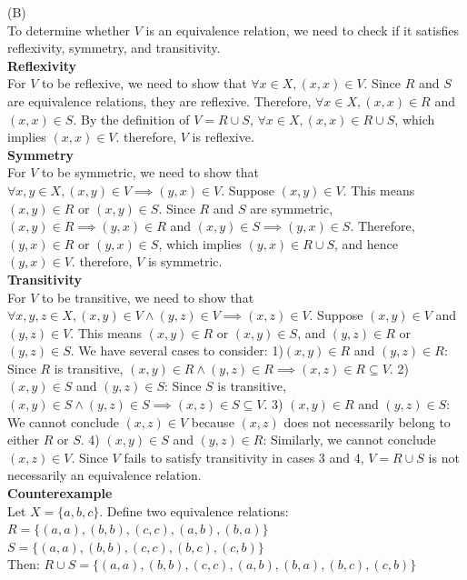 \documentclass[solution,letterpaper]{cs20}
\begin{document}
\begin{problem}
\begin{solution}
        (B) \\
        To determine whether \( V \) is an equivalence relation, we need to check if it satisfies reflexivity, symmetry, and transitivity. \\
        \textbf{Reflexivity} \\
        For \( V \) to be reflexive, we need to show that \(\forall x \in X, (x, x) \in V\). Since \( R \) and \( S \) are equivalence relations, they are reflexive. Therefore, \(\forall x \in X, (x, x) \in R\) and \((x, x) \in S\). By the definition of \( V = R \cup S \), \(\forall x \in X, (x, x) \in R \cup S\), which implies \((x, x) \in V\). therefore, \( V \) is reflexive. \\
        \textbf{Symmetry} \\
        For \( V \) to be symmetric, we need to show that \(\forall x, y \in X, (x, y) \in V \implies (y, x) \in V\). Suppose \((x, y) \in V\). This means \((x, y) \in R\) or \((x, y) \in S\). Since \( R \) and \( S \) are symmetric, \((x, y) \in R \implies (y, x) \in R\) and \((x, y) \in S \implies (y, x) \in S\). Therefore, \((y, x) \in R\) or \((y, x) \in S\), which implies \((y, x) \in R \cup S\), and hence \((y, x) \in V\). therefore, \( V \) is symmetric. \\
        \textbf{Transitivity} \\
        For \( V \) to be transitive, we need to show that \(\forall x, y, z \in X, (x, y) \in V \wedge (y, z) \in V \implies (x, z) \in V\). Suppose \((x, y) \in V\) and \((y, z) \in V\). This means \((x, y) \in R\) or \((x, y) \in S\), and \((y, z) \in R\) or \((y, z) \in S\). We have several cases to consider:
        1)\((x, y) \in R\) and \((y, z) \in R\): Since \( R \) is transitive, \((x, y) \in R \wedge (y, z) \in R \implies (x, z) \in R \subseteq V\).
        2) \((x, y) \in S\) and \((y, z) \in S\): Since \( S \) is transitive, \((x, y) \in S \wedge (y, z) \in S \implies (x, z) \in S \subseteq V\).
        3) \((x, y) \in R\) and \((y, z) \in S\): We cannot conclude \((x, z) \in V\) because \((x, z)\) does not necessarily belong to either \( R \) or \( S \).
        4) \((x, y) \in S\) and \((y, z) \in R\): Similarly, we cannot conclude \((x, z) \in V\).
        Since \( V \) fails to satisfy transitivity in cases 3 and 4, \( V = R \cup S \) is not necessarily an equivalence relation. \\
        \textbf{Counterexample} \\
        Let \( X = \{a, b, c\} \). Define two equivalence relations: \\
        \( R = \{(a, a), (b, b), (c, c), (a, b), (b, a)\} \) \\
        \( S = \{(a, a), (b, b), (c, c), (b, c), (c, b)\} \) \\
        Then: \( R \cup S = \{(a, a), (b, b), (c, c), (a, b), (b, a), (b, c), (c, b)\} \)  \\


\end{solution}
\end{problem}
\end{document}
